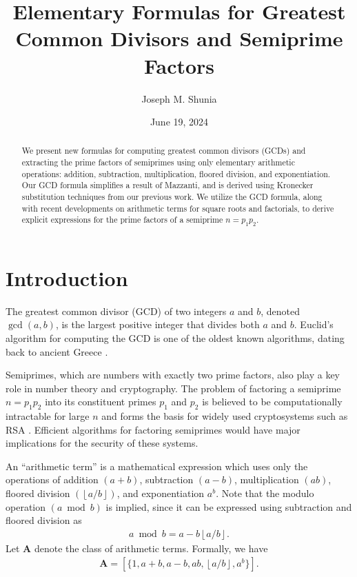 \documentclass[11pt,reqno]{article}
\title{Elementary Formulas for Greatest Common Divisors and Semiprime Factors}
\author{Joseph M. Shunia}
\date{June 19, 2024}
\theoremstyle{plain}
\theoremstyle{definition}
\newcommand{\floor}[1]{\left\lfloor #1 \right\rfloor}
\begin{document}
\maketitle

\begin{abstract}
We present new formulas for computing greatest common divisors (GCDs) and extracting the prime factors of semiprimes using only elementary arithmetic operations: addition, subtraction, multiplication, floored division, and exponentiation. Our GCD formula simplifies a result of Mazzanti, and is derived using Kronecker substitution techniques from our previous work. We utilize the GCD formula, along with recent developments on arithmetic terms for square roots and factorials, to derive explicit expressions for the prime factors of a semiprime $n=p_1p_2$.
\end{abstract}

\section{Introduction}

The greatest common divisor (GCD) of two integers $a$ and $b$, denoted $\gcd(a,b)$, is the largest positive integer that divides both $a$ and $b$. Euclid's algorithm for computing the GCD is one of the oldest known algorithms, dating back to ancient Greece \cite{knuth1997art}.

Semiprimes, which are numbers with exactly two prime factors, also play a key role in number theory and cryptography. The problem of factoring a semiprime $n=p_1 p_2$ into its constituent primes $p_1$ and $p_2$ is believed to be computationally intractable for large $n$ and forms the basis for widely used cryptosystems such as RSA \cite{rivest1978rsa}. Efficient algorithms for factoring semiprimes would have major implications for the security of these systems.

An ``arithmetic term'' is a mathematical expression which uses only the operations of addition $(a+b)$, subtraction $(a-b)$, multiplication $(ab)$, floored division $(\floor{a/b})$, and exponentiation $a^b$. Note that the modulo operation $(a \bmod b)$ is implied, since it can be expressed using subtraction and floored division as
\begin{align*}
    a \bmod b = a - b \floor{a/b} .
\end{align*}
Let $\textbf{A}$ denote the class of arithmetic terms. Formally, we have
\begin{align*}
\textbf{A} = [ \{ 1, a+b, a-b, ab, \floor{a/b}, a^b \} ].
\end{align*}
\end{document}
